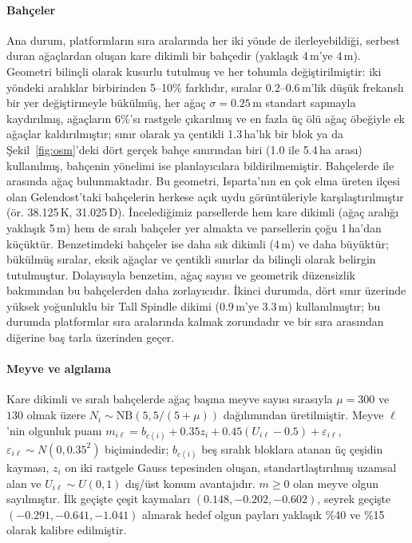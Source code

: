 \paragraph{Bahçeler} Ana durum, platformların sıra aralarında her iki yönde de
ilerleyebildiği, serbest duran ağaçlardan oluşan kare dikimli bir bahçedir (yaklaşık
4\,m'ye 4\,m). Geometri bilinçli olarak kusurlu tutulmuş ve her tohumla değiştirilmiştir:
iki yöndeki aralıklar birbirinden 5--10\% farklıdır, sıralar 0.2--0.6\,m'lik düşük
frekanslı bir yer değiştirmeyle bükülmüş, her ağaç $\sigma=0.25$\,m standart sapmayla kaydırılmış,
ağaçların 6\%'sı rastgele çıkarılmış ve en fazla üç ölü ağaç öbeğiyle ek ağaçlar
kaldırılmıştır; sınır olarak ya çentikli 1.3\,ha'lık bir blok ya da Şekil~\ref{fig:osm}'deki
dört gerçek bahçe sınırından biri (1.0 ile 5.4\,ha arası) kullanılmış, bahçenin yönelimi ise planlayıcılara
bildirilmemiştir. Bahçelerde \HgTreesMin{} ile \HgTreesMax{} arasında ağaç
bulunmaktadır. Bu geometri, Isparta'nın en çok elma üreten ilçesi olan Gelendost'taki
\citep{sargin_2014_isparta} bahçelerin herkese açık uydu görüntüleriyle karşılaştırılmıştır
(ör. 38.125\,K, 31.025\,D). İncelediğimiz parsellerde hem kare dikimli (ağaç aralığı yaklaşık 5\,m)
hem de sıralı bahçeler yer almakta ve parsellerin çoğu 1\,ha'dan küçüktür. Benzetimdeki bahçeler
ise daha sık dikimli (4\,m) ve daha büyüktür; bükülmüş sıralar, eksik ağaçlar ve çentikli sınırlar
da bilinçli olarak belirgin tutulmuştur. Dolayısıyla benzetim, ağaç sayısı ve geometrik düzensizlik
bakımından bu bahçelerden daha zorlayıcıdır. İkinci durumda, dört sınır üzerinde yüksek yoğunluklu bir Tall Spindle
dikimi (0.9\,m'ye 3.3\,m) kullanılmıştır; bu durumda platformlar sıra aralarında kalmak zorundadır
ve bir sıra arasından diğerine baş tarla üzerinden geçer.

\paragraph{Meyve ve algılama} Kare dikimli ve sıralı bahçelerde ağaç başına
meyve sayısı sırasıyla $\mu=300$ ve $130$ olmak üzere
$N_i\sim\mathrm{NB}(5,5/(5+\mu))$ dağılımından üretilmiştir. Meyve $\ell$'nin
olgunluk puanı
$m_{i\ell}=b_{c(i)}+0.35z_i+0.45(U_{i\ell}-0.5)+\varepsilon_{i\ell}$,
$\varepsilon_{i\ell}\sim N(0,0.35^2)$ biçimindedir; $b_{c(i)}$ beş sıralık
bloklara atanan üç çeşidin kayması, $z_i$ on iki rastgele Gauss tepesinden oluşan,
standartlaştırılmış uzamsal alan ve $U_{i\ell}\sim U(0,1)$ dış/üst konum
avantajıdır. $m\ge0$ olan meyve olgun sayılmıştır. İlk geçişte çeşit kaymaları
$(0.148,-0.202,-0.602)$, seyrek geçişte $(-0.291,-0.641,-1.041)$ alınarak
hedef olgun payları yaklaşık \%40 ve \%15 olarak kalibre edilmiştir.

